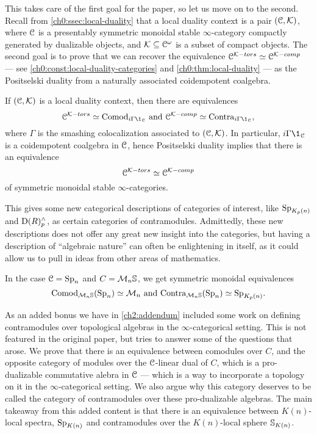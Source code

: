 This takes care of the first goal for the paper, so let us move on to the second. Recall from \cref{ch0:ssec:local-duality} that a local duality context is a pair $(\C, \K)$, where $\C$ is a presentably symmetric monoidal stable $\infty$-category compactly generated by dualizable objects, and $\K\subseteq \Co$ is a subset of compact objects. The second goal is to prove that we can recover the equivalence $\C^{\K-tors}\simeq \C^{\K-comp}$ --- see \cref{ch0:const:local-duality-categories} and \cref{ch0:thm:local-duality} --- as the Positselski duality from a naturally associated coidempotent coalgebra. 

\begin{theorem}
    If $(\C, \K)$ is a local duality context, then there are equivalences 
    \[\C^{\K-tors}\simeq \Comod_{i\Gamma \1_\C} \text{ and } \C^{\K-comp}\simeq \Contra_{i\Gamma \1_\C},\]
    where $\Gamma$ is the smashing colocalization associated to $(\C, \K)$. In particular, $i\Gamma \1_\C$ is a coidempotent coalgebra in $\C$, hence Positselski duality implies that there is an equivalence 
    \[\C^{\K-tors}\simeq \C^{\K-comp}\]
    of symmetric monoidal stable $\infty$-categories. 
\end{theorem}

This gives some new categorical descriptions of categories of interest, like $\SpKpn$ and $\Der(R)^\wedge_p$, as certain categories of contramodules. Admittedly, these new descriptions does not offer any great new insight into the categories, but having a description of ``algebraic nature'' can often be enlightening in itself, as it could allow us to pull in ideas from other areas of mathematics. 

\begin{example}
    In the case $\C= \Spn$ and $C = \Mn\S$, we get symmetric monoidal equivalences 
    \[\Comod_{\Mn\S}(\Spn) \simeq \Mn \text{ and } \Contra_{\Mn\S}(\Spn)\simeq \SpKpn.\]
\end{example}

As an added bonus we have in \cref{ch2:addendum} included some work on defining contramodules over topological algebras in the $\infty$-categorical setting. This is not featured in the original paper, but tries to answer some of the questions that arose. We prove that there is an equivalence between comodules over $C$, and the opposite category of modules over the $\C$-linear dual of $C$, which is a pro-dualizable commutative alebra in $\C$ --- which is a way to incorporate a topology on it in the $\infty$-categorical setting. We also argue why this category deserves to be called the category of contramodules over these pro-dualizable algebras. The main takeaway from this added content is that there is an equivalence between $K(n)$-local spectra, $\SpKn$ and contramodules over the $K(n)$-local sphere $\S_{K(n)}$. 




